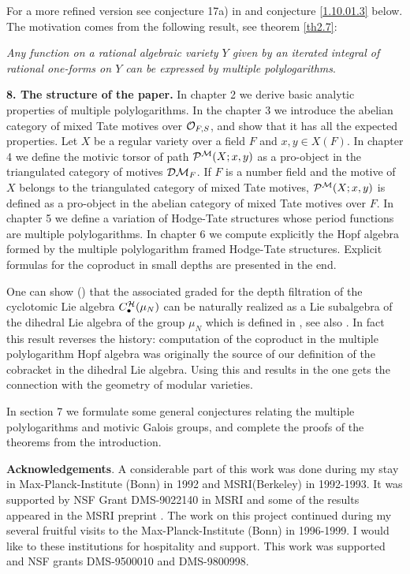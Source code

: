\documentclass[10pt]{article}
\begin{document}
For a  more refined version see conjecture 17a) in \cite{G1} and conjecture \ref{1.10.01.3} 
 below.
The motivation comes from the following result, see theorem \ref{th2.7}: 

{\it Any function on a rational algebraic variety $Y$ given by an iterated integral of rational one-forms on $Y$ can be expressed by multiple polylogarithms}.


{\bf 8. The structure of the paper.} In chapter 2 we derive basic analytic properties 
of multiple polylogarithms. 
In the chapter  3 we introduce the abelian category 
of mixed Tate motives over ${\cal O}_{F,S}$, 
and show that it has all the expected properties. Let $X$ be  a regular variety over 
a field $F$ and $x, y \in X(F)$. In chapter 4 we define the motivic torsor of path 
${\cal P}^{\cal M}(X; x,y)$ as a pro-object in the triangulated category of motives 
${\cal D}{\cal M}_F$. If 
$F$ is a number field and the motive of $X$ belongs to the 
triangulated category of mixed Tate motives,  ${\cal P}^{\cal M}(X; x,y)$ is defined as a 
pro-object in the abelian category of mixed Tate motives over $F$. 
In chapter 5 we define a variation of  Hodge-Tate structures 
whose period functions are multiple polylogarithms. In chapter  6 we compute explicitly 
the Hopf algebra formed by  the multiple polylogarithm framed Hodge-Tate structures. 
Explicit formulas for the coproduct in small depths 
are presented in the end. 

One can show (\cite{G10}) that the associated graded 
for the depth filtration of the 
cyclotomic Lie algebra $C^{\cal H}_{\bullet}(\mu_N)$ can be  naturally realized 
 as a Lie subalgebra of 
 the dihedral Lie algebra of the group $\mu_N$ which is defined in \cite{G3}, see also 
\cite{G4}. 
In fact this result reverses the history: 
computation of the coproduct in the multiple polylogarithm Hopf algebra  was 
originally the source of our definition 
of the cobracket in the dihedral Lie algebra. 
Using this and  results in the\cite{G3,G4} one gets  the connection 
with the geometry of modular varieties. 

In section 7 we formulate some general 
conjectures relating the multiple polylogarithms and motivic Galois groups, 
and complete the proofs of 
the theorems from the introduction. 


{\bf Acknowledgements}. A considerable part of this work was done during my stay in 
Max-Planck-Institute (Bonn) in 1992 and MSRI(Berkeley) in 1992-1993. It
was supported by   
NSF Grant DMS-9022140 in MSRI and some of the results appeared in the MSRI preprint \cite{G0}. The work on this project continued during my several fruitful 
visits to  the 
Max-Planck-Institute (Bonn) in 1996-1999. 
I would
like to these institutions for hospitality and support.  This work was 
supported and NSF grants DMS-9500010 and DMS-9800998. 
\end{document}
